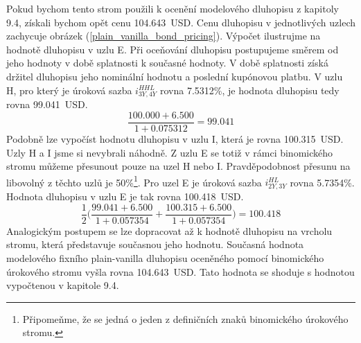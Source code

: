 \documentclass[a4paper]{book}
\begin{document}
Pokud bychom tento strom použili k ocenění modelového dluhopisu z kapitoly 9.4, získali bychom opět cenu 104.643~USD. Cenu dluhopisu v jednotlivých uzlech zachycuje obrázek (\ref{plain_vanilla_bond_pricing}). Výpočet ilustrujme na hodnotě dluhopisu v uzlu E. Při oceňování dluhopisu postupujeme směrem od jeho hodnoty v době splatnosti k současné hodnoty. V době splatnosti získá držitel dluhopisu jeho nominální hodnotu a poslední kupónovou platbu. V uzlu H, pro který je úroková sazba $i^{HHL}_{3Y,4Y}$ rovna 7.5312\%, je hodnota dluhopisu tedy rovna 99.041~USD.
\begin{equation*}
\frac{100.000 + 6.500}{1 + 0.075312} = 99.041
\end{equation*}
Podobně lze vypočíst hodnotu dluhopisu v uzlu I, která je rovna 100.315~USD. Uzly H a I jsme si nevybrali náhodně. Z uzlu E se totiž v rámci binomického stromu můžeme přesunout pouze na uzel H nebo I. Pravděpodobnost přesunu na libovolný z těchto uzlů je 50\%\footnote{Připomeňme, že se jedná o jeden z definičních znaků binomického úrokového stromu.}. Pro uzel E je úroková sazba $i^{HL}_{2Y,3Y}$ rovna 5.7354\%. Hodnota dluhopisu v uzlu E je tak rovna 100.418~USD.
\begin{equation*}
\frac{1}{2}\Bigg( \frac{99.041 + 6.500}{1 + 0.057354} + \frac{100.315 + 6.500}{1 + 0.057354} \Bigg) = 100.418
\end{equation*}
Analogickým postupem se lze dopracovat až k hodnotě dluhopisu na vrcholu stromu, která představuje současnou jeho hodnotu. Současná hodnota modelového fixního plain-vanilla dluhopisu oceněného pomocí binomického úrokového stromu vyšla rovna 104.643~USD. Tato hodnota se shoduje s hodnotou vypočtenou v kapitole 9.4.
\end{document}
